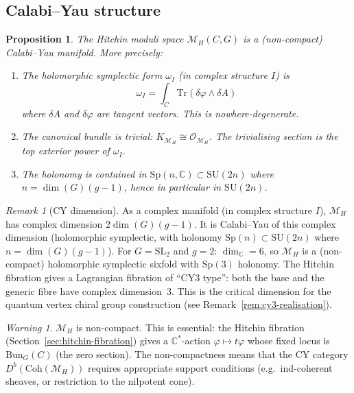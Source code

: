 \documentclass[11pt]{article}
\newtheorem{proposition}[theorem]{Proposition}
\theoremstyle{definition}
\theoremstyle{remark}
\newtheorem{remark}[theorem]{Remark}
\newtheorem{warning}[theorem]{Warning}
\newcommand{\Bun}{\mathrm{Bun}}
\newcommand{\Coh}{\mathrm{Coh}}
\newcommand{\Tr}{\mathrm{Tr}}
\newcommand{\cM}{\mathcal{M}}
\newcommand{\cO}{\mathcal{O}}
\begin{document}
\subsection{Calabi--Yau structure}

\begin{proposition}
\label{prop:hitchin-cy}
The Hitchin moduli space $\cM_H(C, G)$ is a (non-compact) Calabi--Yau manifold. More precisely:
\begin{enumerate}[label=(\roman*)]
 \item The holomorphic symplectic form $\omega_I$ (in complex structure $I$) is
 \[
 \omega_I = \int_C \Tr(\delta\varphi \wedge \delta A)
 \]
 where $\delta A$ and $\delta\varphi$ are tangent vectors. This is nowhere-degenerate.
 \item The canonical bundle is trivial: $K_{\cM_H} \cong \cO_{\cM_H}$. The trivialising section is the top exterior power of $\omega_I$.
 \item The holonomy is contained in $\mathrm{Sp}(n, \mathbb{C}) \subset \mathrm{SU}(2n)$ where $n = \dim(G)(g-1)$, hence in particular in $\mathrm{SU}(2n)$.
\end{enumerate}
\end{proposition}

\begin{remark}[CY dimension]
\label{rem:cy-dim-hitchin}
As a complex manifold (in complex structure $I$), $\cM_H$ has complex dimension $2\dim(G)(g-1)$. It is Calabi--Yau of this complex dimension (holomorphic symplectic, with holonomy $\mathrm{Sp}(n) \subset \mathrm{SU}(2n)$ where $n = \dim(G)(g-1)$). For $G = \mathrm{SL}_2$ and $g = 2$: $\dim_\mathbb{C} = 6$, so $\cM_H$ is a (non-compact) holomorphic symplectic sixfold with $\mathrm{Sp}(3)$ holonomy. The Hitchin fibration gives a Lagrangian fibration of ``CY3 type'': both the base and the generic fibre have complex dimension~3. This is the critical dimension for the quantum vertex chiral group construction (see Remark~\ref{rem:cy3-realisation}).
\end{remark}

\begin{warning}
\label{warn:non-compact}
$\cM_H$ is non-compact. This is essential: the Hitchin fibration (Section~\ref{sec:hitchin-fibration}) gives a $\mathbb{C}^*$-action $\varphi \mapsto t\varphi$ whose fixed locus is $\Bun_G(C)$ (the zero section). The non-compactness means that the CY category $D^b(\Coh(\cM_H))$ requires appropriate support conditions (e.g.\ ind-coherent sheaves, or restriction to the nilpotent cone).
\end{warning}
\end{document}
